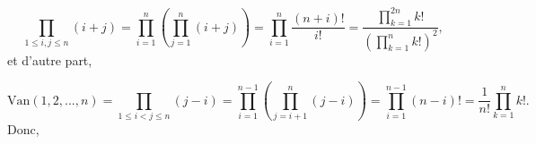{{$$\prod_{1\leq i,j\leq n}^{}(i+j)=\prod_{i=1}^{n}\left(\prod_{j=1}^{n}(i+j)\right)=\prod_{i=1}^{n}\frac{(n+i)!}{i!}
=\frac{\prod_{k=1}^{2n}k!}{\left(\prod_{k=1}^{n}k!\right)^2},$$  
et d'autre part,

$$\mbox{Van}(1,2,...,n)=\prod_{1\leq i<j\leq n}^{}(j-i)=\prod_{i=1}^{n-1}\left(\prod_{j=i+1}^{n}(j-i)\right)=\prod_{i=1}^{n-1}(n-i)!=\frac{1}{n!}\prod_{k=1}^{n}k!.$$
Donc,

\begin{center}
\end{center}
}
}
